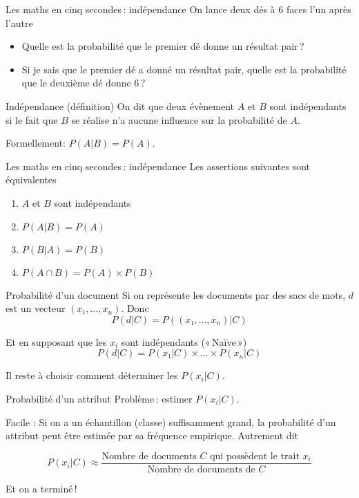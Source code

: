 \documentclass[hyperref={unicode}, xcolor={svgnames}, french]{beamer}
\newcommand{\itpause}{%
	\addtocounter{beamerpauses}{-1}%
	\pause
}
\begin{document}
\begin{frame}{Les maths en cinq secondes : indépendance}
	On lance deux dés à \num{6} faces l'un après l'autre

	\begin{itemize}
		\item<+-> Quelle est la probabilité que le premier dé donne un résultat pair ?
		\item<+-> Si je sais que le premier dé a donné un résultat pair, quelle est la probabilité que le deuxième dé donne \num{6} ?
	\end{itemize}
	\itpause

	\begin{block}{Indépendance (définition)}
		On dit que deux évènement $A$ et $B$ sont indépendants si le fait que $B$ se réalise n'a aucune influence sur la probabilité de $A$.

		Formellement: $P(A|B)=P(A)$.
	\end{block}
\end{frame}


\begin{frame}{Les maths en cinq secondes : indépendance}
	Les assertions suivantes sont équivalentes
	\begin{enumerate}[<+->]
		\item $A$ et $B$ sont indépendants
		\item $P(A|B)=P(A)$
		\item $P(B|A)=P(B)$
		\item $P(A∩B) = P(A)×P(B)$
	\end{enumerate}
\end{frame}


\begin{frame}{Probabilité d'un document}
    Si on représente les documents par des sacs de mots, $d$ est un vecteur $(x₁, …, x_n)$.
    Donc
    \begin{equation}
        P(d|C) = P((x₁, …, x_n)|C)
    \end{equation}

    Et en supposant que les $x_i$ sont indépendants (« Naïve »)
    \begin{equation}
        P(d|C) = P(x₁|C)×…×P(x_n|C)
    \end{equation}

    Il reste à choisir comment déterminer les $P(x_i|C)$.
\end{frame}

\begin{frame}{Probabilité d'un attribut}
	Problème : estimer $P(x_i|C)$.

	\pause
	Facile : Si on a un échantillon (classe) suffisamment grand, la probabilité d'un attribut peut être estimée par sa fréquence empirique. Autrement dit

	\pause

	\begin{equation}
		P(x_i|C) ≈ \frac{\text{Nombre de documents $C$ qui possèdent le trait $x_i$}}{\text{Nombre de documents de $C$}}
	\end{equation}

	\pause
	Et on a terminé !
\end{frame}
\end{document}
